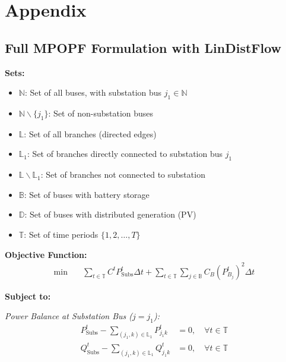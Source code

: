 \newpage

\appendix
\section*{Appendix}
\label{sec:appendix}

% 

\subsection*{Full MPOPF Formulation with LinDistFlow}
\label{subsec:full-mpopf}

\textbf{Sets:}
\begin{itemize}
    \item $\mathbb{N}$: Set of all buses, with substation bus $j_1 \in \mathbb{N}$
    \item $\mathbb{N} \backslash \{j_1\}$: Set of non-substation buses
    \item $\mathbb{L}$: Set of all branches (directed edges)
    \item $\mathbb{L}_1$: Set of branches directly connected to substation bus $j_1$
    \item $\mathbb{L} \backslash \mathbb{L}_1$: Set of branches not connected to substation
    \item $\mathbb{B}$: Set of buses with battery storage
    \item $\mathbb{D}$: Set of buses with distributed generation (PV)
    \item $\mathbb{T}$: Set of time periods $\{1, 2, \ldots, T\}$
\end{itemize}

\textbf{Objective Function:}
\begin{align}
    \min \quad & \sum_{t \in \mathbb{T}} C^t P^t_{\text{Subs}} \Delta t 
    + \sum_{t \in \mathbb{T}} \sum_{j \in \mathbb{B}} C_B (P_{B_j}^t)^2 \Delta t
\end{align}

\textbf{Subject to:}

\textit{Power Balance at Substation Bus ($j = j_1$):}
\begin{align}
    P^t_{\text{Subs}} - \sum_{(j_1, k) \in \mathbb{L}_1} P_{j_1 k}^t &= 0, \quad \forall t \in \mathbb{T} \label{eq:subs_real} \\
    Q^t_{\text{Subs}} - \sum_{(j_1, k) \in \mathbb{L}_1} Q_{j_1 k}^t &= 0, \quad \forall t \in \mathbb{T} \label{eq:subs_reactive}
\end{align}

